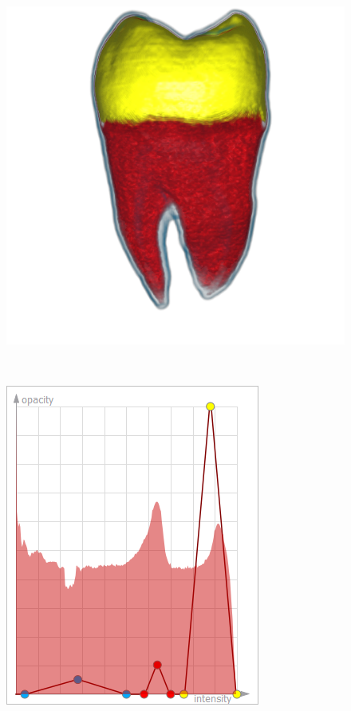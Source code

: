 \begin{figure}
\begin{minipage}{.2\textwidth}
		\subcaption{}
	\end{minipage}~
	\begin{minipage}{.29\textwidth}
		\includegraphics[width=1\linewidth]{images/tooth_naive_optimized_linesearch}
		\subcaption{}
	\end{minipage}~
	\begin{minipage}{.2\textwidth}
		\includegraphics[width=1\linewidth]{figures/tf_tooth_naive_optimized_linesearch}
		\subcaption{}
	\end{minipage}
		

\end{figure}

